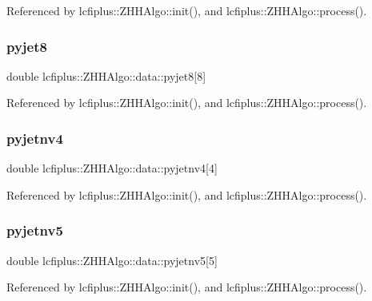 Referenced by lcfiplus\+::\+Z\+H\+H\+Algo\+::init(), and lcfiplus\+::\+Z\+H\+H\+Algo\+::process().

\mbox{\label{structlcfiplus_1_1ZHHAlgo_1_1data_a8fd8c3e3fdd36fb9462bdaac1cb41ab9}} 
\subsubsection{pyjet8}
{\footnotesize\ttfamily double lcfiplus\+::\+Z\+H\+H\+Algo\+::data\+::pyjet8[8]}



Referenced by lcfiplus\+::\+Z\+H\+H\+Algo\+::init(), and lcfiplus\+::\+Z\+H\+H\+Algo\+::process().

\mbox{\label{structlcfiplus_1_1ZHHAlgo_1_1data_a3023517899b1f3bcd4508c19a8b9d081}} 
\subsubsection{pyjetnv4}
{\footnotesize\ttfamily double lcfiplus\+::\+Z\+H\+H\+Algo\+::data\+::pyjetnv4[4]}



Referenced by lcfiplus\+::\+Z\+H\+H\+Algo\+::init(), and lcfiplus\+::\+Z\+H\+H\+Algo\+::process().

\mbox{\label{structlcfiplus_1_1ZHHAlgo_1_1data_a367c8013a6d2b354dfa6d7e8c5cf77db}} 
\subsubsection{pyjetnv5}
{\footnotesize\ttfamily double lcfiplus\+::\+Z\+H\+H\+Algo\+::data\+::pyjetnv5[5]}



Referenced by lcfiplus\+::\+Z\+H\+H\+Algo\+::init(), and lcfiplus\+::\+Z\+H\+H\+Algo\+::process().

\mbox{\label{structlcfiplus_1_1ZHHAlgo_1_1data_aa85555d3b04d8bd0f5938c1c408e9e46}} 
